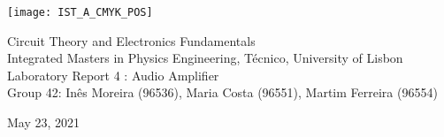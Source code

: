 
\thispagestyle {empty}

\texttt{[image: IST\_A\_CMYK\_POS]}

\begin{center}
%
\vspace{1.0cm}

\vspace{1cm}
{\FontLb Circuit Theory and Electronics Fundamentals} \\ %
\vspace{1cm}
{\FontSn Integrated Masters in Physics Engineering, Técnico, University of Lisbon} \\ %
\vspace{1cm}
{\FontSn Laboratory Report 4 : Audio Amplifier} \\
\vspace{1cm}
{\FontSn Group 42: Inês Moreira (96536), Maria Costa (96551), Martim Ferreira (96554)}
\vspace{1cm}
\par
{\FontSn May 23, 2021} \\ %
\vspace{1cm}
%
\end{center}

